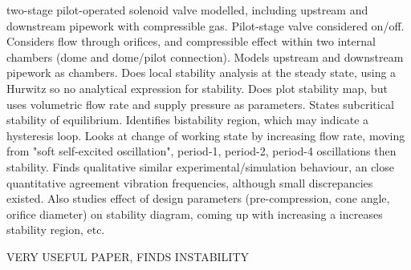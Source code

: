 \cite{Ye2009DynamicSystem}
two-stage pilot-operated solenoid valve modelled, including upstream and downstream pipework with compressible gas. Pilot-stage valve considered on/off. Considers flow through orifices, and compressible effect within two internal chambers (dome and dome/pilot connection). Models upstream and downstream pipework as chambers. Does local stability analysis at the steady state, using a Hurwitz so no analytical expression for stability. Does plot stability map, but uses volumetric flow rate and supply pressure as parameters. States subcritical stability of equilibrium. Identifies bistability region, which may indicate a hysteresis loop. Looks at change of working state by increasing flow rate, moving from "soft self-excited oscillation", period-1, period-2, period-4 oscillations then stability. Finds qualitative similar experimental/simulation behaviour, an close quantitative agreement vibration frequencies, although small discrepancies existed. Also studies effect of design parameters (pre-compression, cone angle, orifice diameter) on stability diagram, coming up with increasing a increases stability region, etc.

\cite{Allison2015TestingValves}
VERY USEFUL PAPER, FINDS INSTABILITY




